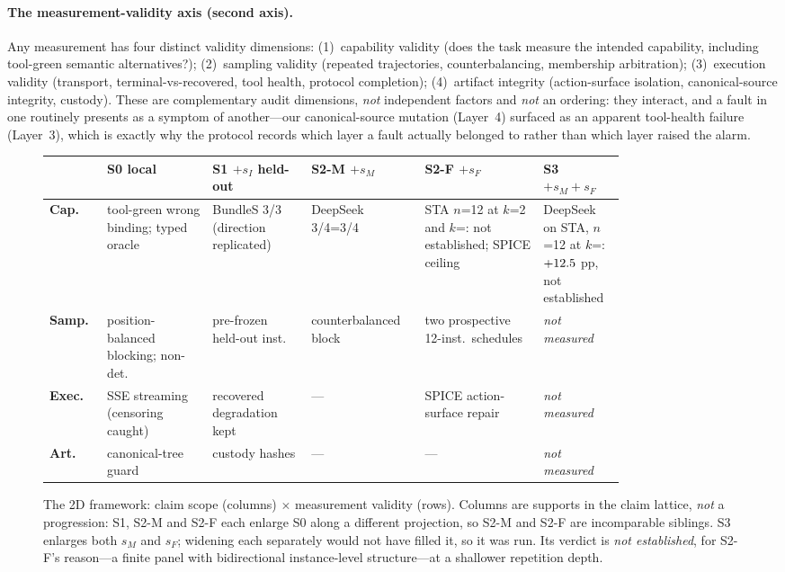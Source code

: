 \documentclass{article}
\begin{document}
\paragraph{The measurement-validity axis (second axis).} Any measurement has four distinct validity dimensions: (1)~capability validity (does the task measure the intended capability, including tool-green semantic alternatives?); (2)~sampling validity (repeated trajectories, counterbalancing, membership arbitration); (3)~execution validity (transport, terminal-vs-recovered, tool health, protocol completion); (4)~artifact integrity (action-surface isolation, canonical-source integrity, custody). These are complementary audit dimensions, \emph{not} independent factors and \emph{not} an ordering: they interact, and a fault in one routinely presents as a symptom of another---our canonical-source mutation (Layer~4) surfaced as an apparent tool-health failure (Layer~3), which is exactly why the protocol records which layer a fault actually belonged to rather than which layer raised the alarm.

\begin{figure}[h]
\centering\scriptsize
\caption{The 2D framework: claim scope (columns) $\times$ measurement validity (rows). Columns are supports in the claim lattice, \emph{not} a progression: S1, S2-M and S2-F each enlarge S0 along a different projection, so S2-M and S2-F are incomparable siblings. S3 enlarges both $s_M$ and $s_F$; widening each separately would not have filled it, so it was run. Its verdict is \emph{not established}, for S2-F's reason---a finite panel with bidirectional instance-level structure---at a shallower repetition depth.}
\label{fig:2d}
\begin{tabular}{p{0.07\linewidth}|p{0.165\linewidth} p{0.15\linewidth} p{0.14\linewidth} p{0.185\linewidth} p{0.105\linewidth}}
\toprule
 & \textbf{S0} local & \textbf{S1} $+s_I$ held-out & \textbf{S2-M} $+s_M$ & \textbf{S2-F} $+s_F$ & \textbf{S3} $+s_M{+}s_F$ \\
\midrule
\textbf{Cap.} & tool-green wrong binding; typed oracle & BundleS 3/3 (direction replicated) & DeepSeek 3/4=3/4 & STA $n$=12 at $k$=2 and $k$=\StatEightAK{}: not established; SPICE ceiling & DeepSeek on STA, $n$=12 at $k$=\StatArmTwoK{}: $+12.5$ pp, not established \\
\textbf{Samp.} & position-balanced blocking; non-det. & pre-frozen held-out inst. & counterbalanced block & two prospective 12-inst.\ schedules & \emph{not measured} \\
\textbf{Exec.} & SSE streaming (censoring caught) & recovered degradation kept & --- & SPICE action-surface repair & \emph{not measured} \\
\textbf{Art.} & canonical-tree guard & custody hashes & --- & --- & \emph{not measured} \\
\bottomrule
\end{tabular}
\end{figure}
\end{document}
